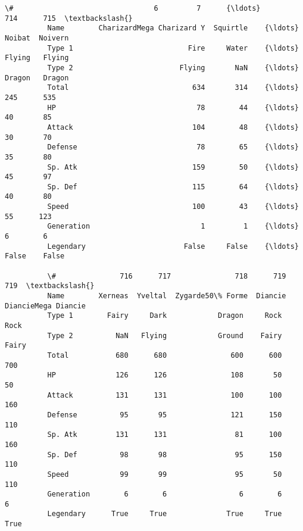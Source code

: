 \documentclass[11pt]{article}
\begin{document}
\begin{Verbatim}[commandchars=\\\{\}]
          \#                                 6         7      {\ldots}         714      715  \textbackslash{}
          Name        CharizardMega Charizard Y  Squirtle    {\ldots}      Noibat  Noivern   
          Type 1                           Fire     Water    {\ldots}      Flying   Flying   
          Type 2                         Flying       NaN    {\ldots}      Dragon   Dragon   
          Total                             634       314    {\ldots}         245      535   
          HP                                 78        44    {\ldots}          40       85   
          Attack                            104        48    {\ldots}          30       70   
          Defense                            78        65    {\ldots}          35       80   
          Sp. Atk                           159        50    {\ldots}          45       97   
          Sp. Def                           115        64    {\ldots}          40       80   
          Speed                             100        43    {\ldots}          55      123   
          Generation                          1         1    {\ldots}           6        6   
          Legendary                       False     False    {\ldots}       False    False   
          
          \#               716      717               718      719                  719  \textbackslash{}
          Name        Xerneas  Yveltal  Zygarde50\% Forme  Diancie  DiancieMega Diancie   
          Type 1        Fairy     Dark            Dragon     Rock                 Rock   
          Type 2          NaN   Flying            Ground    Fairy                Fairy   
          Total           680      680               600      600                  700   
          HP              126      126               108       50                   50   
          Attack          131      131               100      100                  160   
          Defense          95       95               121      150                  110   
          Sp. Atk         131      131                81      100                  160   
          Sp. Def          98       98                95      150                  110   
          Speed            99       99                95       50                  110   
          Generation        6        6                 6        6                    6   
          Legendary      True     True              True     True                 True   
          

\end{Verbatim}
\end{document}
